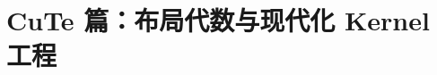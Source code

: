 \documentclass[9pt,openany]{ctexbook}
\begin{document}
\part{CuTe 篇：布局代数与现代化 Kernel 工程}





\backmatter
\end{document}
